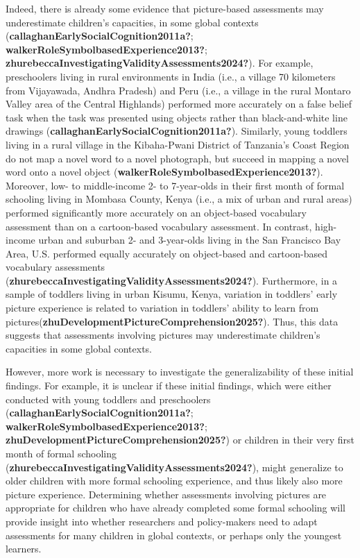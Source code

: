 \documentclass[10pt, letterpaper]{article}
\begin{document}
Indeed, there is already some evidence that picture-based assessments
may underestimate children's capacities, in some global contexts
(\textbf{callaghanEarlySocialCognition2011a?};
\textbf{walkerRoleSymbolbasedExperience2013?};
\textbf{zhurebeccaInvestigatingValidityAssessments2024?}). For example,
preschoolers living in rural environments in India (i.e., a village 70
kilometers from Vijayawada, Andhra Pradesh) and Peru (i.e., a village in
the rural Montaro Valley area of the Central Highlands) performed more
accurately on a false belief task when the task was presented using
objects rather than black-and-white line drawings
(\textbf{callaghanEarlySocialCognition2011a?}). Similarly, young
toddlers living in a rural village in the Kibaha-Pwani District of
Tanzania's Coast Region do not map a novel word to a novel photograph,
but succeed in mapping a novel word onto a novel object
(\textbf{walkerRoleSymbolbasedExperience2013?}). Moreover, low- to
middle-income 2- to 7-year-olds in their first month of formal schooling
living in Mombasa County, Kenya (i.e., a mix of urban and rural areas)
performed significantly more accurately on an object-based vocabulary
assessment than on a cartoon-based vocabulary assessment. In contrast,
high-income urban and suburban 2- and 3-year-olds living in the San
Francisco Bay Area, U.S. performed equally accurately on object-based
and cartoon-based vocabulary assessments
(\textbf{zhurebeccaInvestigatingValidityAssessments2024?}). Furthermore,
in a sample of toddlers living in urban Kisumu, Kenya, variation in
toddlers' early picture experience is related to variation in toddlers'
ability to learn from
pictures(\textbf{zhuDevelopmentPictureComprehension2025?}). Thus, this
data suggests that assessments involving pictures may underestimate
children's capacities in some global contexts.

However, more work is necessary to investigate the generalizability of
these initial findings. For example, it is unclear if these initial
findings, which were either conducted with young toddlers and
preschoolers (\textbf{callaghanEarlySocialCognition2011a?};
\textbf{walkerRoleSymbolbasedExperience2013?};
\textbf{zhuDevelopmentPictureComprehension2025?}) or children in their
very first month of formal schooling
(\textbf{zhurebeccaInvestigatingValidityAssessments2024?}), might
generalize to older children with more formal schooling experience, and
thus likely also more picture experience. Determining whether
assessments involving pictures are appropriate for children who have
already completed some formal schooling will provide insight into
whether researchers and policy-makers need to adapt assessments for many
children in global contexts, or perhaps only the youngest learners.
\end{document}
